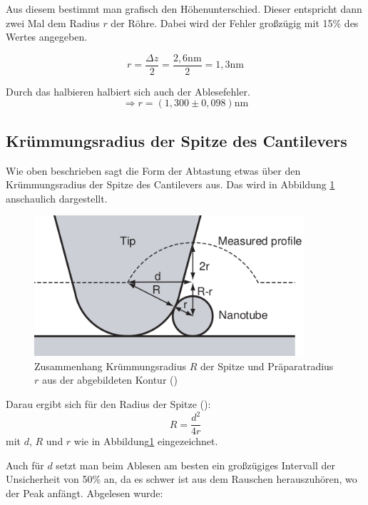 Aus diesem bestimmt man grafisch den Höhenunterschied. Dieser entspricht dann zwei Mal dem Radius $r$ der Röhre. Dabei wird der Fehler 
großzügig mit 15\% des Wertes angegeben.

\begin{equation*}
   r = \frac{\Delta z}{2} = \frac{2,6\mathrm{nm}}{2} = 1,3\mathrm{nm}
\end{equation*}

Durch das halbieren halbiert sich auch der Ablesefehler. 
\begin{equation*}
    \Rightarrow r = (1,300 \pm 0,098)\mathrm{nm}
\end{equation*}


\subsection{Krümmungsradius der Spitze des Cantilevers}

Wie oben beschrieben sagt die Form der Abtastung etwas über den Krümmungsradius der Spitze des Cantilevers aus. Das wird in Abbildung 
\ref{NanoTip} anschaulich dargestellt.

\begin{figure}
    \centering
    \includegraphics[width = 10cm]{Bilder/Nanotubes/TipGeoNano.png}
    \caption{Zusammenhang Krümmungsradius $R$ der Spitze und Präparatradius $r$ aus der abgebildeten Kontur (\cite[S.46]{SampleKit2007})}
    \label{NanoTip}
\end{figure}

Darau ergibt sich für den Radius der Spitze (\cite[S.47]{SampleKit2007}):\\
\begin{equation}
    R = \frac{d^2}{4r}
\end{equation}
mit $d$, $R$ und $r$ wie in Abbildung\ref{NanoTip} eingezeichnet.

Auch für $d$ setzt man beim Ablesen am besten ein großzügiges Intervall der Unsicherheit von 50\% an, da es schwer ist aus 
dem Rauschen herauszuhören, wo der Peak anfängt. Abgelesen wurde:\\


